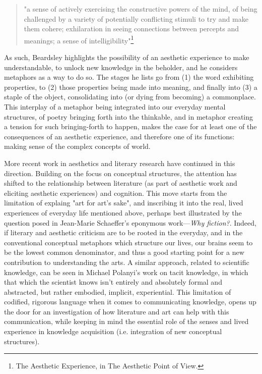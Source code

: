\documentclass{article}
\begin{document}
\begin{quote}
  "a sense of actively exercising the constructive powers of the mind, of being challenged by a variety of potentially conflicting stimuli to try and make them cohere; exhilaration in seeing connections between percepts and meanings; a sense of intelligibility"\footnote{The Aesthetic Experience, in The Aesthetic Point of View\cite{beardsley_aesthetic_1970}.}
\end{quote}

As such, Beardsley highlights the possibility of an aesthetic experience to make understandable, to unlock new knowledge in the beholder, and he considers metaphors as a way to do so. The stages he lists go from (1) the word exhibiting properties, to (2) those properties being made into meaning, and finally into (3) a staple of the object, consolidating into (or dying from becoming) a commonplace. This interplay of a metaphor being integrated into our everyday mental structures, of poetry bringing forth into the thinkable, and in metaphor creating a tension for such bringing-forth to happen, makes the case for at least one of the consequences of an aesthetic experience, and therefore one of its functions: making sense of the complex concepts of world.

More recent work in aesthetics and literary research have continued in this direction. Building on the focus on conceptual structures, the attention has shifted to the relationship between literature (as part of aesthetic work and eliciting aesthetic experiences) and cognition. This move starts from the limitation of explaing "art for art's sake", and inscribing it into the real, lived experiences of everyday life mentioned above, perhaps best illustrated by the question posed in Jean-Marie Schaeffer's eponymous work—\emph{Why fiction?}. Indeed, if literary and aesthetic criticism are to be rooted in the everyday, and in the conventional conceptual metaphors which structure our lives, our brains seem to be the lowest common denominator, and thus a good starting point for a new contribution to understanding the arts. A similar approach, related to scientific knowledge, can be seen in Michael Polanyi's work on tacit knowledge, in which that which the scientist knows isn't entirely and absolutely formal and abstracted, but rather embodied, implicit, experiential. This limitation of codified, rigorous language when it comes to communicating knowledge, opens up the door for an investigation of how literature and art can help with this communication, while keeping in mind the essential role of the senses and lived experience in knowledge acquisition (i.e. integration of new conceptual structures)\cite{polanyi_tacit_2009}.
\end{document}
